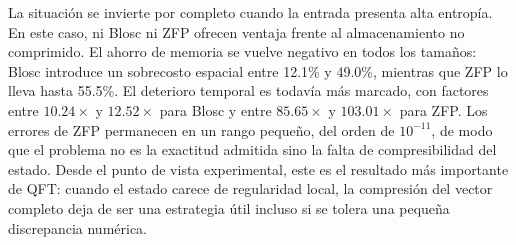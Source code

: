 La situación se invierte por completo cuando la entrada presenta alta entropía. En este caso,
ni Blosc ni ZFP ofrecen ventaja frente al almacenamiento no comprimido. El ahorro de memoria
se vuelve negativo en todos los tamaños: Blosc introduce un sobrecosto espacial entre 12.1\%
y 49.0\%, mientras que ZFP lo lleva hasta 55.5\%. El deterioro temporal es todavía más
marcado, con factores entre $10.24\times$ y $12.52\times$ para Blosc y entre $85.65\times$ y
$103.01\times$ para ZFP. Los errores de ZFP permanecen en un rango pequeño, del orden de
$10^{-11}$, de modo que el problema no es la exactitud admitida sino la falta de compresibilidad
del estado. Desde el punto de vista experimental, este es el resultado más importante de QFT:
cuando el estado carece de regularidad local, la compresión del vector completo deja de ser una
estrategia útil incluso si se tolera una pequeña discrepancia numérica.
